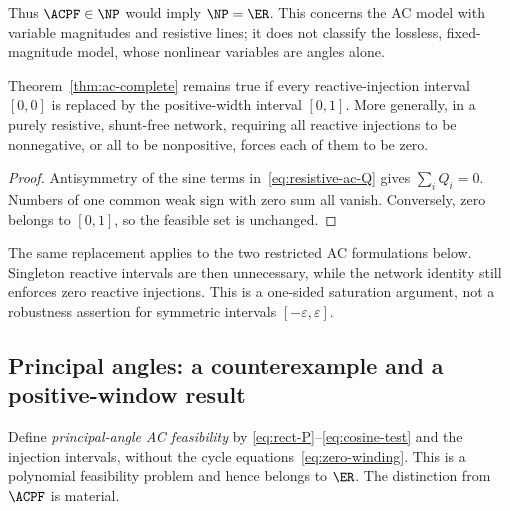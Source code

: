 Thus $\ACPF\in\NP$ would imply $\NP=\ER$. This concerns the AC model with
variable magnitudes and resistive lines; it does not classify the lossless,
fixed-magnitude model, whose nonlinear variables are angles alone.

\begin{corollary}
\label{cor:one-sided-reactive}
Theorem~\ref{thm:ac-complete} remains true if every reactive-injection
interval $[0,0]$ is replaced by the positive-width interval $[0,1]$.
More generally, in a purely resistive, shunt-free network, requiring all
reactive injections to be nonnegative, or all to be nonpositive, forces
each of them to be zero.
\end{corollary}
\begin{proof}
Antisymmetry of the sine terms in~\eqref{eq:resistive-ac-Q} gives
$\sum_i Q_i=0$. Numbers of one common weak sign with zero sum all vanish.
Conversely, zero belongs to $[0,1]$, so the feasible set is unchanged.
\end{proof}

The same replacement applies to the two restricted AC formulations below.
Singleton reactive intervals are then unnecessary, while the network
identity still enforces zero reactive injections. This is a one-sided
saturation argument, not a robustness assertion for symmetric intervals
$[-\varepsilon,\varepsilon]$.

\subsection{Principal angles: a counterexample and a positive-window result}
\label{subsec:principal}

Define \emph{principal-angle AC feasibility} by
\eqref{eq:rect-P}--\eqref{eq:cosine-test} and the injection intervals, without
the cycle equations~\eqref{eq:zero-winding}. This is a polynomial feasibility
problem and hence belongs to $\ER$. The distinction from $\ACPF$ is material.

